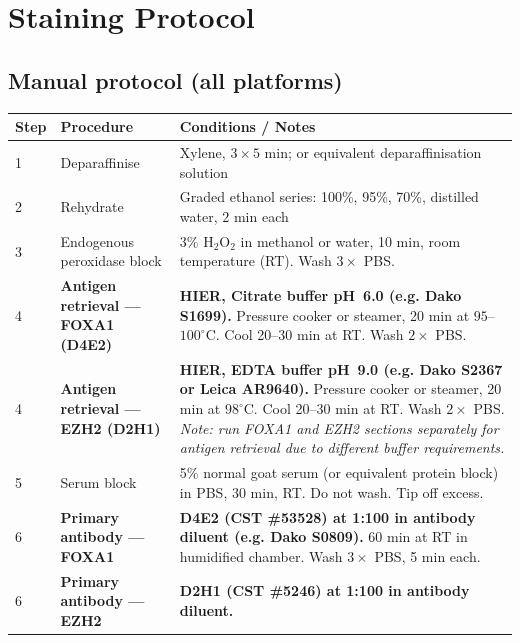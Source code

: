 \documentclass[11pt, a4paper]{article}
\begin{document}
\section{Staining Protocol}

\subsection{Manual protocol (all platforms)}

\begin{center}
\begin{tabular}{p{0.8cm}p{5cm}p{7.5cm}}
\toprule
\textbf{Step} & \textbf{Procedure} &
\textbf{Conditions / Notes} \\
\midrule
1 & Deparaffinise &
    Xylene, $3 \times 5$ min; or equivalent
    deparaffinisation solution \\[0.3em]
2 & Rehydrate &
    Graded ethanol series: 100\%, 95\%, 70\%,
    distilled water, $2$ min each \\[0.3em]
3 & Endogenous peroxidase block &
    3\% $\text{H}_2\text{O}_2$ in methanol
    or water, 10 min, room temperature (RT).
    Wash $3\times$ PBS. \\[0.3em]
4 & \textbf{Antigen retrieval ---
    FOXA1 (D4E2)} &
    \textbf{HIER, Citrate buffer pH~6.0
    (e.g. Dako S1699).}
    Pressure cooker or steamer, 20 min at
    $95$--$100^\circ$C.
    Cool 20--30 min at RT.
    Wash $2\times$ PBS. \\[0.3em]
4 & \textbf{Antigen retrieval ---
    EZH2 (D2H1)} &
    \textbf{HIER, EDTA buffer pH~9.0
    (e.g. Dako S2367 or Leica AR9640).}
    Pressure cooker or steamer, 20 min at
    $98^\circ$C.
    Cool 20--30 min at RT.
    Wash $2\times$ PBS.
    \textit{Note: run FOXA1 and EZH2
    sections separately for antigen
    retrieval due to different buffer
    requirements.} \\[0.3em]
5 & Serum block &
    5\% normal goat serum (or equivalent
    protein block) in PBS, 30 min, RT.
    Do not wash. Tip off excess. \\[0.3em]
6 & \textbf{Primary antibody ---
    FOXA1} &
    \textbf{D4E2 (CST \#53528) at 1:100
    in antibody diluent (e.g. Dako S0809).}
    60 min at RT in humidified chamber.
    Wash $3\times$ PBS, 5 min each. \\[0.3em]
6 & \textbf{Primary antibody ---
    EZH2} &
    \textbf{D2H1 (CST \#5246) at 1:100
    in antibody diluent.}

\end{tabular}
\end{center}
\end{document}
